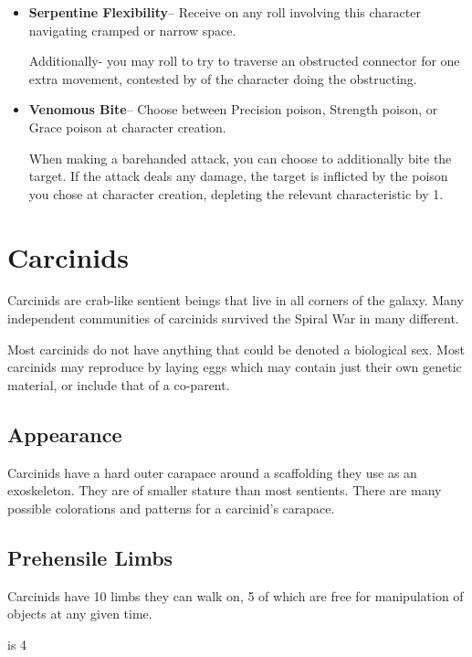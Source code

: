 {\begin{itemize}
	\item \textbf{Serpentine Flexibility}-- Receive  on any roll involving this character navigating cramped or narrow space.

	Additionally- you may roll  to try to traverse an obstructed connector for one extra movement, contested by  of the character doing the obstructing.
	\item \textbf{Venomous Bite}-- Choose between Precision poison, Strength poison, or Grace poison at character creation.

	When making a barehanded attack, you can choose to additionally bite the target. If the attack deals any damage, the target is inflicted by the poison you chose at character creation, depleting the relevant characteristic by 1.
\end{itemize}

\GRPpagebreak
\section{Carcinids}

Carcinids are crab-like sentient beings that live in all corners of the galaxy. Many independent communities of carcinids survived the Spiral War in many different.

Most carcinids do not have anything that could be denoted a biological sex. Most carcinids may reproduce by laying eggs which may contain just their own genetic material, or include that of a co-parent.

\subsection*{Appearance}

Carcinids have a hard outer carapace around a scaffolding they use as an exoskeleton. They are of smaller stature than most sentients. There are many possible colorations and patterns for a carcinid's carapace.

\subsection*{Prehensile Limbs}

Carcinids have 10 limbs they can walk on, 5 of which are free for manipulation of objects at any given time.

 is 4

}
